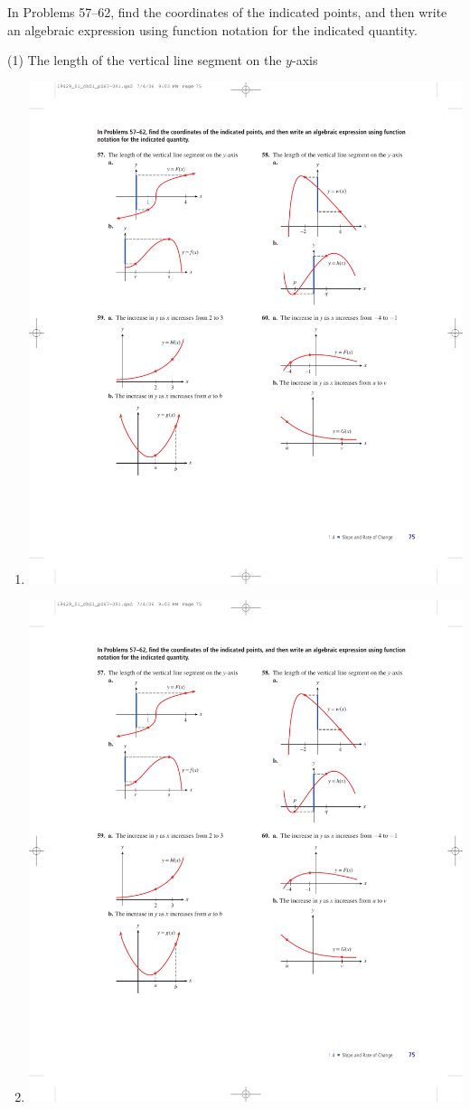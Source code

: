 \documentclass[10pt,]{book}
\theoremstyle{plain}
\theoremstyle{definition}
\theoremstyle{definition}
\theoremstyle{definition}
\theoremstyle{definition}
\numberwithin{equation}{part}
\begin{document}
\par\smallskip\noindent
\hypertarget{exercisegroup-34}{}\par\noindent In Problems 57–62, find the coordinates of the indicated points,  and then write an algebraic expression using function notation for the indicated quantity.%
\begin{exercisegroup}(1)
\exercise[57.]\hypertarget{exercise-272}{}The length of the vertical line segment on the \(y\)-axis \leavevmode%
\begin{multicols}{2}
\begin{enumerate}[label=*\alph**]
\item\hypertarget{li-1072}{}\includegraphics[width=0.8\linewidth]{images/fig-ex-1-4-57a}
%
\item\hypertarget{li-1073}{}\includegraphics[width=0.8\linewidth]{images/fig-ex-1-4-57b}

\end{enumerate}
\end{multicols}
\end{exercisegroup}
\end{document}
